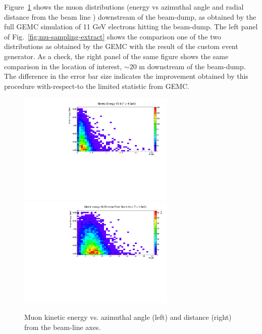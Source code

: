 Figure~\ref{fig:mu-sampling} shows the muon distributions (energy vs azimuthal angle and radial distance from the beam line ) downstream of the beam-dump, as obtained by the full GEMC simulation of  11 GeV electrons hitting the beam-dump.
The left panel of Fig.~\ref{fig:mu-sampling-extract} shows the comparison one of the two distributions as obtained by the GEMC with the result of the custom event generator. 
As a check, the right panel of the same figure  shows the same comparison in the location of interest, $\sim 20$ m downstream of the beam-dump.
The difference in the error bar size indicates the improvement obtained by this procedure with-respect-to  the limited statistic from GEMC. 

\begin{figure}[h!] 
\center
\includegraphics[width=7.5cm]{figs/EkinVStheta.pdf}
\includegraphics[width=7.5cm]{figs/EkinVSR.pdf}
\caption{Muon kinetic energy vs. azimuthal angle (left) and distance (right) from the beam-line axes.}
\label{fig:mu-sampling}
\end{figure}
